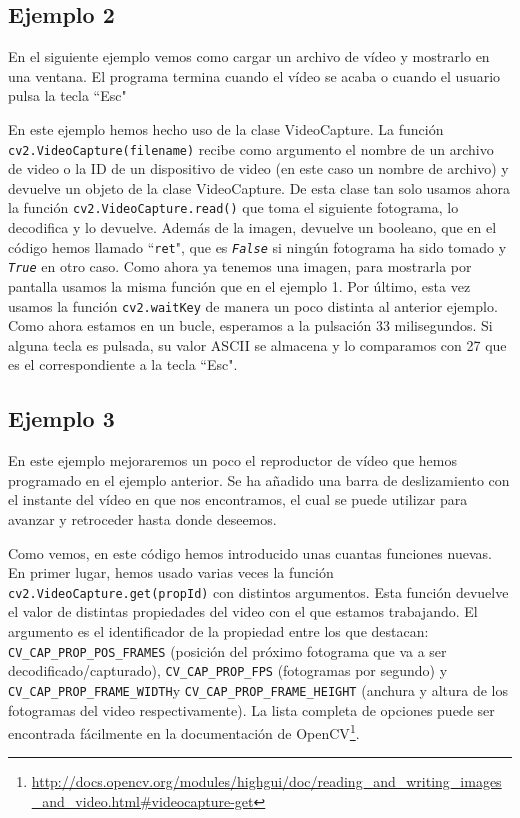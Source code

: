 \documentclass[a4paper,openright, 12pt]{book}
\begin{document}
\subsection*{Ejemplo 2}
En el siguiente ejemplo vemos como cargar un archivo de vídeo y mostrarlo en una ventana. El programa termina cuando el vídeo se acaba o cuando el usuario pulsa la tecla ``Esc"

En este ejemplo hemos hecho uso de la clase VideoCapture.
La función \lstinline|cv2.VideoCapture(filename)| recibe como argumento el nombre de un archivo de video o la ID de un dispositivo de video (en este caso un nombre de archivo) y devuelve un objeto de la clase VideoCapture.
De esta clase tan solo usamos ahora la función \lstinline|cv2.VideoCapture.read()| que toma el siguiente fotograma, lo decodifica y lo devuelve. Además de la imagen, devuelve un booleano, que en el código hemos llamado ``\lstinline|ret|", que es \textit{\lstinline|False|} si ningún fotograma ha sido tomado y \textit{\lstinline|True|} en otro caso.
Como ahora ya tenemos una imagen, para mostrarla por pantalla usamos la misma función que en el ejemplo 1.
Por último, esta vez usamos la función \lstinline|cv2.waitKey| de manera un poco distinta al anterior ejemplo. Como ahora estamos en un bucle, esperamos a la pulsación 33 milisegundos. Si alguna tecla es pulsada, su valor ASCII se almacena y lo comparamos con 27 que es el correspondiente a la tecla ``Esc".

\newpage
\subsection*{Ejemplo 3}
En este ejemplo mejoraremos un poco el reproductor de vídeo que hemos programado en el ejemplo anterior. Se ha añadido una barra de deslizamiento con el instante del vídeo en que nos encontramos, el cual se puede utilizar para avanzar y retroceder hasta donde deseemos.

Como vemos, en este código hemos introducido unas cuantas funciones nuevas.
En primer lugar, hemos usado varias veces la función \lstinline|cv2.VideoCapture.get(propId)| con distintos argumentos.
Esta función devuelve el valor de distintas propiedades del video con el que estamos trabajando. El argumento es el identificador de la propiedad entre los que destacan: \lstinline|CV_CAP_PROP_POS_FRAMES| (posición del próximo fotograma que va a ser decodificado/capturado), \lstinline|CV_CAP_PROP_FPS| (fotogramas por segundo) y \lstinline|CV_CAP_PROP_FRAME_WIDTH|y \lstinline|CV_CAP_PROP_FRAME_HEIGHT| (anchura y altura de los fotogramas del video respectivamente).
La lista completa de opciones puede ser encontrada fácilmente en la documentación de OpenCV\footnote{\url{http://docs.opencv.org/modules/highgui/doc/reading_and_writing_images_and_video.html#videocapture-get}}.
\end{document}
